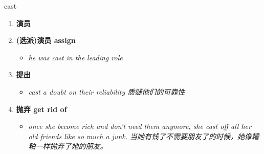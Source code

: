 
\begin{frame}
{\huge cast}
\begin{center}
\begin{enumerate}\Large
  \item \textbf{演员}
  \item \textbf{(选派)演员 assign}
  \begin{itemize}
    \item \em{\Large{he was cast in the leading role}}
  \end{itemize}
  \item \textbf{提出}
  \begin{itemize}
    \item \em{\Large{cast a doubt on their reliability 质疑他们的可靠性}}
  \end{itemize}
  \item \textbf{抛弃 get rid of}
  \begin{itemize}
    \item \em{\Large{once she become rich and don't need them anymore, she cast off all her old friends like so much a junk. 当她有钱了不需要朋友了的时候，她像糟粕一样抛弃了她的朋友。}}
  \end{itemize}
\end{enumerate}
\end{center}
\end{frame}

